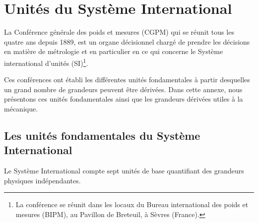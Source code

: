 \chapter{Unités du Système International\label{annexe-usi}}
La Conférence générale des poids et mesures (CGPM) qui se réunit tous les 
quatre ans depuis 1889, est un organe décisionnel chargé de prendre les 
décisions en matière de métrologie et en particulier en ce qui concerne le 
Système international d'unités (SI)\footnote{La conférence se réunit dans les 
locaux du Bureau international des poids et mesures (BIPM), au Pavillon de 
Breteuil, à Sèvres (France).}.

Ces conférences ont établi les différentes unités fondamentales à partir 
desquelles un grand nombre de grandeurs peuvent être dérivées. Dans cette 
annexe, nous présentons ces unités fondamentales ainsi que les grandeurs 
dérivées utiles à la mécanique.

\section*{Les unités fondamentales du Système International}
Le Système International compte sept unités de base quantifiant des grandeurs 
physiques indépendantes.

